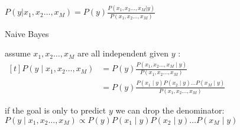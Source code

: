\documentclass[landscape, a4paper]{article}
\begin{document}
\begin{minipage}[t]{0.2\linewidth}
\begin{betterlist}
\begin{betterlist}
			$\displaystyle P(y | x_1, x_2 \ldots , x_M) = P(y)\frac{P(x_1, x_2 \ldots , x_M | y)}{P(x_1, x_2 \ldots, x_M)}$
			\item \alert{Naive Bayes}
			\begin{betterlist}
				\item assume $x_1, x_2 \ldots, x_M$ are all independent given $y$ :\\ $\begin{aligned}[t]
						P\left(y \mid x_1, x_2 \ldots, x_M\right) & =P(y) \frac{P\left(x_1, x_2 \ldots, x_M \mid y\right)}{P\left(x_1, x_2 \ldots, x_M\right)}                                         \\
						                                          & =P(y) \frac{P\left(x_1 \mid y\right) P\left(x_2 \mid y\right) \ldots P\left(x_M \mid y\right)}{P\left(x_1, x_2 \ldots, x_M\right)}
					\end{aligned}$
				\item if the goal is only to predict $y$ we can drop the denominator:\\ $P\left(y \mid x_1, x_2 \ldots, x_M\right) \propto P(y) P\left(x_1 \mid y\right) P\left(x_2 \mid y\right) \ldots P\left(x_M \mid y\right)$
			\end{betterlist}
			\item {}
		\end{betterlist}
	\end{betterlist}
\end{minipage}
\end{document}
